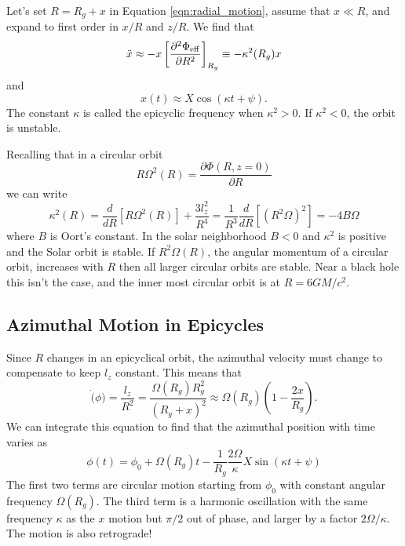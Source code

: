 \documentclass[]{article}
\begin{document}
Let's set $R = R_g+x$ in Equation \ref{eqn:radial_motion}, assume that $x\ll R$, and expand to
first order in $x/R$ and $z/R$.  We find that
\begin{equation}
\ddot{x} \approx - x\left[\frac{\partial^2 \Phi_\mathrm{eff}}{\partial R^2}\right]_{R_g}\equiv - \kappa^2(R_g)x
\end{equation}
\noindent
and
\begin{equation}
x(t) \approx X \cos(\kappa t + \psi).
\end{equation}
\noindent
The constant $\kappa$ is called the epicyclic frequency when $\kappa^2>0$.  If $\kappa^2<0$,
the orbit is unstable.

Recalling that in a circular orbit
\begin{equation}
R \Omega^2(R) = \frac{\partial \Phi(R,z=0)}{\partial R}
\end{equation}
\noindent
we can write
\begin{equation}
\kappa^2(R) = \frac{d}{dR}[R\Omega^2(R)] + \frac{3 l_z^2}{R^4} = \frac{1}{R^3}\frac{d}{dR}[(R^2\Omega)^2] = -4B\Omega
\end{equation}
\noindent
where $B$ is Oort's constant.  In the solar neighborhood $B<0$ and $\kappa^2$ is positive and the Solar
orbit is stable.  If $R^2\Omega(R)$, the angular momentum of a circular orbit, increases with $R$ then
all larger circular orbits are stable.  Near a black hole this isn't the case, and the inner
most circular orbit is at $R=6GM/c^2$.

\subsection{Azimuthal Motion in Epicycles}

Since $R$ changes in an epicyclical orbit, the azimuthal velocity must change to
compensate to keep $l_z$ constant.  This means that
\begin{equation}
\dot(\phi) = \frac{l_z}{R^2} = \frac{\Omega(R_g)R_g^2}{(R_g + x)^2} \approx \Omega(R_g)\left(1 - \frac{2x}{R_g}\right).
\end{equation}
\noindent
We can integrate this equation to find that the azimuthal position with time varies as
\begin{equation}
\phi(t) = \phi_0  + \Omega(R_g)t - \frac{1}{R_g}\frac{2\Omega}{\kappa}X \sin(\kappa t + \psi)
\end{equation}
\noindent
The first two terms are circular motion starting from $\phi_0$ with constant angular
frequency $\Omega(R_g)$.  The third term is a harmonic oscillation with the same
frequency $\kappa$ as the $x$ motion but $\pi/2$ out of phase, and
larger by a factor $2\Omega/\kappa$.
The motion is also retrograde!
\end{document}
